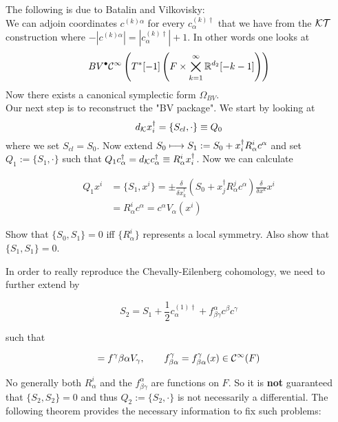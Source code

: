 The following is due to Batalin and Vilkovisky:\\
We can adjoin coordinates $c^{(k)\alpha}$ for every $c^{(k)\dagger}_\alpha$ that we have from the ${\mathcal{KT}}$ construction where $-|c^{(k)\alpha}| = |c^{(k)\dagger}_\alpha| + 1$. In other words one looks at
\begin{equation}
  BV^\bullet \mathcal{C}^{\infty}\left(T^*[-1]\left(F \times \bigtimes_{k = 1}^\infty \mathbb{R}^{d_2}[-k-1]\right)\right)
\end{equation}
Now there exists a canonical symplectic form $\Omega_{BV}$.\\

Our next step is to reconstruct the "BV package". We start by looking at
\begin{equation}
  d_{{\mathcal{K}}} x^\dagger_i = \{ S_{cl}, \cdot \} \equiv Q_0
\end{equation}
where we set $S_{cl} = S_0$. Now extend $S_0 \longmapsto S_1 := S_0 + x^\dagger_i R^i_\alpha c^\alpha$ and set $Q_1 := \{ S_1, \cdot \}$ such that $Q_1 c^\dagger_\alpha = d_{{\mathcal{K}}} c^\dagger_\alpha \equiv R^i_\alpha x^\dagger_i$. Now we can calculate

\begin{align}
  Q_1 x^i &= \{ S_1, x^i \} = \pm \frac{\delta}{\delta x^\dagger_k} ( S_0 + x^\dagger_j R^j_\alpha c^\alpha) \frac{\delta}{\delta x^k} x^i \\
  &= R^i_\alpha c^\alpha = c^\alpha V_\alpha(x^i)
\end{align}

\begin{ex}
  Show that $\{S_0, S_1\} = 0$ iff $\{R^i_\alpha\}$ represents a local symmetry. Also show that $\{S_1, S_1\} = 0$.
\end{ex}

In order to really reproduce the Chevally-Eilenberg cohomology, we need to further extend by

\begin{equation}
  S_2 = S_1 + \frac{1}{2} c^{(1)\dagger}_\alpha + f^\alpha_{\beta\gamma} c^\beta c^\gamma
\end{equation}

such that

\begin{equation}
  [V_\beta, V_\alpha] = f^\gamma{\beta\alpha} V_\gamma, \quad \quad f^\gamma_{\beta\alpha} = f^\gamma_{\beta\alpha} (x) \in \Ci(F)
\end{equation}

No generally both $R^i_\alpha$ and the $f^\alpha_{\beta\gamma}$ are functions on $F$. So it is \textbf{not} guaranteed that $\{S_2, S_2\} = 0$ and thus $Q_2 := \{S_2, \cdot\}$ is not necessarily a differential. The following theorem provides the necessary information to fix such problems:

